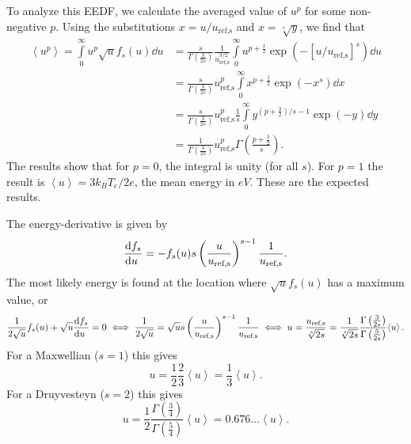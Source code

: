 \documentclass{book}
\newcommand{\MEAN}[1]{\ensuremath{\!\left\langle{{#1}}\right\rangle}}
\begin{document}
To analyze this EEDF, we calculate the averaged value of $u^p$ for some
non-negative $p$. Using the substitutions $x = u/u_{\text{ref,s}}$ and $x=\sqrt[s]{y}$,
we find that
\begin{align}
	\MEAN{u^p}
	= \int\limits_0^\infty u^p \sqrt{u}f_s(u)\dd{u}
	&= \frac{s}{\Gamma\left(\frac{3}{2s}\right)}
	\frac{1}{u_{\text{ref,s}}^{3/2}}
	\int\limits_0^\infty
	u^{p+\frac{1}{2}}
	\exp\left(-\left[u/u_{\text{ref,s}}\right]^s\right)\dd{u}
	\nonumber \\
	&= \frac{s}{\Gamma\left(\frac{3}{2s}\right)}
	u_{\text{ref,s}}^{p}
	\int\limits_0^\infty
	x^{p+\frac{1}{2}}
	\exp\left(-x^s\right)\dd{x}
	\nonumber \\
	&= \frac{s}{\Gamma\left(\frac{3}{2s}\right)}
	u_{\text{ref,s}}^{p}
	\frac{1}{s}
	\int\limits_0^\infty
	y^{\left(p+\frac{3}{2}\right)/s-1}
	\exp\left(-y\right)\dd{y}
	\nonumber \\
	&= \frac{1}{\Gamma\left(\frac{3}{2s}\right)}
	u_{\text{ref,s}}^{p}
	\Gamma\left(\frac{p+\frac{3}{2}}{s}\right).
\end{align}
The results show that for $p=0$, the integral is unity (for all $s$). For $p=1$ the
result is $\MEAN{u}=3k_BT_e/2e$, the mean energy in $\si{eV}$. These are the expected results.

The energy-derivative is given by
\begin{equation}
	\DERIV{f_s}{u} = -f_s(u) s\left(\frac{u}{u_{\text{ref,s}}}\right)^{s-1} \frac{1}{u_{\text{ref,s}}}.
\end{equation}
The most likely energy is found at the location where $\sqrt{u}f_s(u)$ has a maximum value, or
\begin{equation}
	\frac{1}{2\sqrt{u}}f_s(u) + \sqrt{u}\DERIV{f_s}{u} = 0
	\iff
	\frac{1}{2\sqrt{u}} = \sqrt{u} s\left(\frac{u}{u_{\text{ref,s}}}\right)^{s-1} \frac{1}{u_{\text{ref,s}}}
	\iff
	u = \frac{u_{\text{ref,s}}}{\sqrt[s]{2s}}
	  = \frac{1}{\sqrt[s]{2s}}\frac{\Gamma\left(\frac{3}{2s}\right)}{\Gamma\left(\frac{5}{2s}\right)}\MEAN{u}.
\end{equation}
For a Maxwellian ($s=1$) this gives
\begin{equation}
	u = \frac{1}{2}\frac{2}{3}\MEAN{u} = \frac{1}{3}\MEAN{u}.
\end{equation}
For a Druyvesteyn ($s=2$) this gives
\begin{equation}
	u = \frac{1}{2}\frac{\Gamma\left(\frac{3}{4}\right)}{\Gamma\left(\frac{5}{4}\right)}\MEAN{u}
	  = 0.676\ldots\MEAN{u}.
\end{equation}
\end{document}
